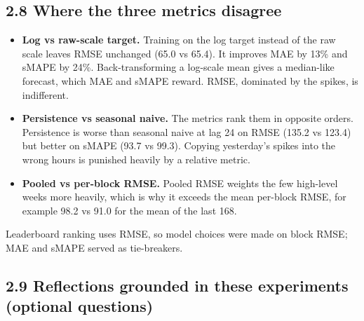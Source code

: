 \subsection*{2.8 Where the three metrics disagree}

\begin{itemize}
  \item \textbf{Log vs raw-scale target.} Training on the log target instead of the raw scale leaves RMSE unchanged (65.0 vs 65.4). It improves MAE by 13\% and sMAPE by 24\%. Back-transforming a log-scale mean gives a median-like forecast, which MAE and sMAPE reward. RMSE, dominated by the spikes, is indifferent.
  \item \textbf{Persistence vs seasonal naive.} The metrics rank them in opposite orders. Persistence is worse than seasonal naive at lag 24 on RMSE (135.2 vs 123.4) but better on sMAPE (93.7 vs 99.3). Copying yesterday's spikes into the wrong hours is punished heavily by a relative metric.
  \item \textbf{Pooled vs per-block RMSE.} Pooled RMSE weights the few high-level weeks more heavily, which is why it exceeds the mean per-block RMSE, for example 98.2 vs 91.0 for the mean of the last 168.
\end{itemize}
Leaderboard ranking uses RMSE, so model choices were made on block RMSE; MAE and sMAPE served as tie-breakers.

\subsection*{2.9 Reflections grounded in these experiments (optional questions)}

